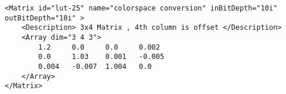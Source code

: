 \begin{lstlisting}[caption=Example of a \xml{Matrix} node]
<Matrix id="lut-25" name="colorspace conversion" inBitDepth="10i" outBitDepth="10i" >
	<Description> 3x4 Matrix , 4th column is offset </Description>
	<Array dim="3 4 3">
		1.2  	0.0  	0.0   	0.002
		0.0 	1.03 	0.001 	-0.005
		0.004 	-0.007 	1.004  	0.0
	</Array>
</Matrix>
\end{lstlisting}